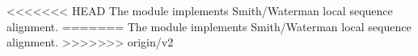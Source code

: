 <<<<<<< HEAD
The  module implements Smith/Waterman local sequence alignment.
=======
The  module implements Smith/Waterman local sequence alignment.
>>>>>>> origin/v2
